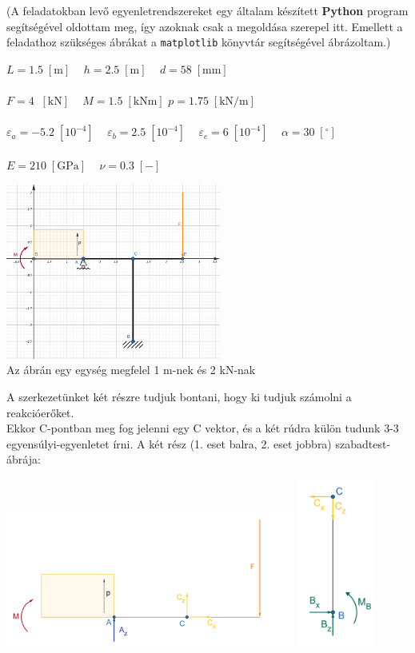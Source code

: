 \documentclass[10pt, a4paper]{article}
\newcommand{\adat}{\begin{trivlist}\item[\hskip \labelsep {\bfseries 
			{Adatok:}}]\end{trivlist}}
\newcommand{\egy}{\begin{trivlist}\item[\hskip \labelsep {\bfseries 
			{1. Feladat:}}]\end{trivlist}}
\newcommand{\knm}{\;\mathrm{\left[kNm\right]}}
\newcommand{\kn}{\;\mathrm{\left[kN\right]}}
\newcommand{\meter}{\mathrm{\left[m\right]}}
\newcommand{\pknm}{\mathrm{\left[kN/m\right]}}
\newcommand{\mm}{\mathrm{\left[mm\right]}}
\newcommand{\minegy}{\mathrm{\left[10^{-4}\right]}}
\newcommand{\dimnel}{\mathrm{\left[-\right]}}
\newcommand{\fok}{\mathrm{\left[^\circ\right]}}
\newcommand{\gpa}{\mathrm{\left[GPa\right]}}
\begin{document}
	
	(A feladatokban levő egyenletrendszereket egy általam készített \textbf{Python} program segítségével oldottam meg, így azoknak csak a megoldása szerepel itt. Emellett a feladathoz szükséges ábrákat a \texttt{matplotlib} könyvtár segítségével ábrázoltam.)
	\adat
	$ L = 1.5\;\meter \;\;\;$ $ h = 2.5\;\meter \;\;\;$ $ d = 58\;\mm$\\\\
	$ F = 4\;\kn \;\;\; $ $ M = 1.5\knm $ $ p = 1.75\;\pknm \;\;\;$\\\\
	$ \varepsilon_a = -5.2\;\minegy \;\;\;$ $ \varepsilon_b = 2.5\;\minegy \;\;\;$ $ \varepsilon_c = 6\;\minegy \;\;\;$ $ \alpha = 30\;\fok \;\;\;$\\\\
	$ E = 210\;\gpa \;\;\;$ $ \nu = 0.3\;\dimnel \;\;\;$
	\setcounter{page}{1}
	\egy
	\begin{center}
		\includegraphics[width=200pt]{ meretarany.png }\\
		Az ábrán egy egység megfelel 1 m-nek és 2 kN-nak
	\end{center}
	A szerkezetünket két részre tudjuk bontani, hogy ki tudjuk számolni a reakcióerőket.\\
	Ekkor C-pontban meg fog jelenni egy C vektor, és a két rúdra külön tudunk 3-3 egyensúlyi-egyenletet írni.
	A két rész (1. eset balra, 2. eset jobbra) szabadtest-ábrája:
	\begin{center}
		\includegraphics[width=270pt]{ SZTA1.png }
		\includegraphics[width=70pt]{ SZTA2.png }
	\end{center}
\end{document}
